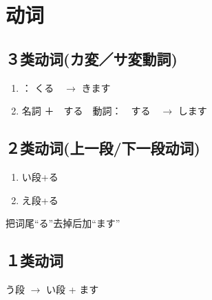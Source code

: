 \section{动词}


\subsection{３类动词(カ変／サ変動詞)}

\begin{enumerate}
    \item {}： くる　$\rightarrow$ きます
    \item 名詞 ＋　する　動詞：　する　$\rightarrow$ します　
\end{enumerate}


\subsection{２类动词(上一段/下一段动词)}

\begin{enumerate}
    \item い段+る
    \item え段+る
\end{enumerate}

把词尾“る”去掉后加“ます”


\subsection{１类动词}

う段 $\rightarrow$ い段 + ます

